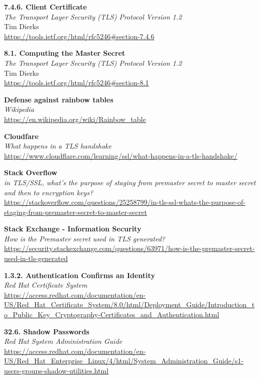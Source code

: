 \documentclass[10pt,a4paper]{article}
\begin{document}
\begin{thebibliography}{9}
	\textbf{7.4.6.  Client Certificate}\\
 	\textit{The Transport Layer Security (TLS) Protocol Version 1.2}\\
	Tim Dierks\\
	\url{https://tools.ietf.org/html/rfc5246#section-7.4.6}
 	
	\textbf{8.1.  Computing the Master Secret}\\
	\textit{The Transport Layer Security (TLS) Protocol Version 1.2}\\
	Tim Dierks\\
 	\url{https://tools.ietf.org/html/rfc5246#section-8.1}
 	
 \textbf{Defense against rainbow tables}\\
 \textit{Wikipedia}\\
 \url{https://en.wikipedia.org/wiki/Rainbow_table}
 
 	\textbf{Cloudfare}\\
 	\textit{What happens in a TLS handshake}\\
 	\url{https://www.cloudflare.com/learning/ssl/what-happens-in-a-tls-handshake/}
 
 	\textbf{Stack Overflow}\\
 	\textit{in TLS/SSL, what's the purpose of staging from premaster secret to master secret and then to encryption keys?}\\
 	\url{https://stackoverflow.com/questions/25258799/in-tls-ssl-whats-the-purpose-of-staging-from-premaster-secret-to-master-secret}
 	
  	\textbf{Stack Exchange - Information Security}\\
  	\textit{How is the Premaster secret used in TLS generated?}\\
 	\url{https://security.stackexchange.com/questions/63971/how-is-the-premaster-secret-used-in-tls-generated}
 
	\textbf{1.3.2. Authentication Confirms an Identity}\\
	\textit{Red Hat Certificate System}\\
 	\url{https://access.redhat.com/documentation/en-US/Red_Hat_Certificate_System/8.0/html/Deployment_Guide/Introduction_to_Public_Key_Cryptography-Certificates_and_Authentication.html}
 	
 	\textbf{32.6. Shadow Passwords}\\
 	\textit{Red Hat System Administration Guide}\\
 	\url{https://access.redhat.com/documentation/en-US/Red_Hat_Enterprise_Linux/4/html/System_Administration_Guide/s1-users-groups-shadow-utilities.html}
 

\end{thebibliography}
\end{document}
